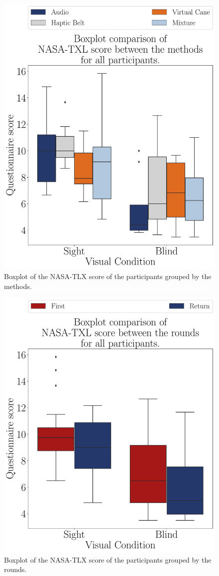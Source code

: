 \begin{figure}[!htb]
    \centering
    \includegraphics[width = 0.75\linewidth]{3 - Resultados/Figuras/boxplot_noBase_nasa_4_scene.pdf}
    \caption{Boxplot of the NASA-TLX score of the participants grouped by the methods.}
    \label{fig:boxplot_noBase_nasa_4_scene}
\end{figure}
\begin{figure}[!htb]
    \centering
    \includegraphics[width = 0.75\linewidth]{3 - Resultados/Figuras/boxplot_noBase_nasa_4_rounds.pdf}
    \caption{Boxplot of the NASA-TLX score of the participants grouped by the rounds.}
    \label{fig:boxplot_noBase_nasa_4_rounds}
\end{figure}

